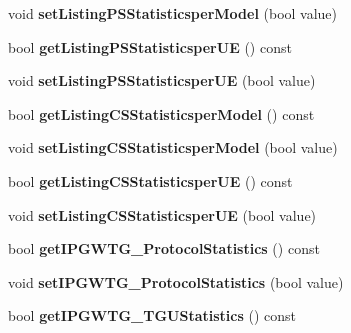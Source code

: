 \begin{DoxyCompactItemize}
\item 
void {\bfseries set\+Listing\+P\+S\+Statisticsper\+Model} (bool value)\hypertarget{class_statistics_ae5b1634aa1572103ecaa32b6e92acfe6}{}\label{class_statistics_ae5b1634aa1572103ecaa32b6e92acfe6}

\item 
bool {\bfseries get\+Listing\+P\+S\+Statisticsper\+UE} () const \hypertarget{class_statistics_a9dbb567d0aa7a50323a64464da8f9896}{}\label{class_statistics_a9dbb567d0aa7a50323a64464da8f9896}

\item 
void {\bfseries set\+Listing\+P\+S\+Statisticsper\+UE} (bool value)\hypertarget{class_statistics_a1ae2b62e8baea3b5a9a454e9b0f39f28}{}\label{class_statistics_a1ae2b62e8baea3b5a9a454e9b0f39f28}

\item 
bool {\bfseries get\+Listing\+C\+S\+Statisticsper\+Model} () const \hypertarget{class_statistics_ad7391e84cbbf7a951efc203a321212c8}{}\label{class_statistics_ad7391e84cbbf7a951efc203a321212c8}

\item 
void {\bfseries set\+Listing\+C\+S\+Statisticsper\+Model} (bool value)\hypertarget{class_statistics_ad0330f894075e67357e5b6d4d4d7e459}{}\label{class_statistics_ad0330f894075e67357e5b6d4d4d7e459}

\item 
bool {\bfseries get\+Listing\+C\+S\+Statisticsper\+UE} () const \hypertarget{class_statistics_a31e9f967bad15533aad9d470ef48d7f0}{}\label{class_statistics_a31e9f967bad15533aad9d470ef48d7f0}

\item 
void {\bfseries set\+Listing\+C\+S\+Statisticsper\+UE} (bool value)\hypertarget{class_statistics_ae5fdee2aba8d99498cc20b3d0b036bbe}{}\label{class_statistics_ae5fdee2aba8d99498cc20b3d0b036bbe}

\item 
bool {\bfseries get\+I\+P\+G\+W\+T\+G\+\_\+\+Protocol\+Statistics} () const \hypertarget{class_statistics_afdc112c1e54cad861da0c35954895f6a}{}\label{class_statistics_afdc112c1e54cad861da0c35954895f6a}

\item 
void {\bfseries set\+I\+P\+G\+W\+T\+G\+\_\+\+Protocol\+Statistics} (bool value)\hypertarget{class_statistics_aa94d4cd48fa53e218ffb37fb775c6f09}{}\label{class_statistics_aa94d4cd48fa53e218ffb37fb775c6f09}

\item 
bool {\bfseries get\+I\+P\+G\+W\+T\+G\+\_\+\+T\+G\+U\+Statistics} () const \hypertarget{class_statistics_a0ef46d68bfc8a2111dd2ba0e9a0126e7}{}\label{class_statistics_a0ef46d68bfc8a2111dd2ba0e9a0126e7}


\end{DoxyCompactItemize}
